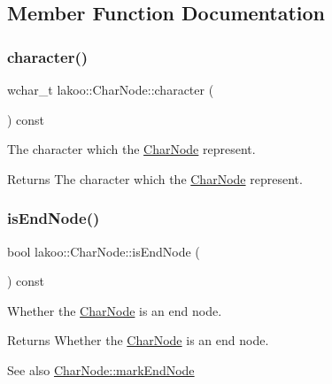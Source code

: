 \subsection{Member Function Documentation}
\mbox{\label{classlakoo_1_1_char_node_ae84c27b0f90851d228cbb3b7c4243022}} 
\subsubsection{\texorpdfstring{character()}{character()}}
{\footnotesize\ttfamily wchar\+\_\+t lakoo\+::\+Char\+Node\+::character (\begin{DoxyParamCaption}{ }\end{DoxyParamCaption}) const\hspace{0.3cm}{\ttfamily [inline]}}



The character which the \hyperlink{classlakoo_1_1_char_node}{Char\+Node} represent. 

\begin{DoxyReturn}{Returns}
The character which the \hyperlink{classlakoo_1_1_char_node}{Char\+Node} represent. 
\end{DoxyReturn}
\mbox{\label{classlakoo_1_1_char_node_ae49687d0eaca8fb554b43b7a044c9b8b}} 
\subsubsection{\texorpdfstring{is\+End\+Node()}{isEndNode()}}
{\footnotesize\ttfamily bool lakoo\+::\+Char\+Node\+::is\+End\+Node (\begin{DoxyParamCaption}{ }\end{DoxyParamCaption}) const\hspace{0.3cm}{\ttfamily [inline]}}



Whether the \hyperlink{classlakoo_1_1_char_node}{Char\+Node} is an end node. 

\begin{DoxyReturn}{Returns}
Whether the \hyperlink{classlakoo_1_1_char_node}{Char\+Node} is an end node. 
\end{DoxyReturn}
\begin{DoxySeeAlso}{See also}
\hyperlink{classlakoo_1_1_char_node_a55da784911560cd110dc600e615ac410}{Char\+Node\+::mark\+End\+Node} 
\end{DoxySeeAlso}
\mbox{\label{classlakoo_1_1_char_node_a55da784911560cd110dc600e615ac410}} 

